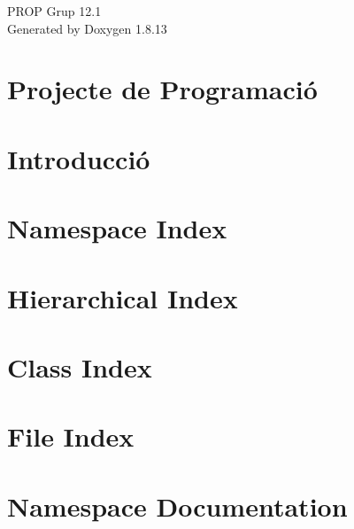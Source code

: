 \documentclass[twoside]{book}
\newcommand{\+}{\discretionary{\mbox{\scriptsize$\hookleftarrow$}}{}{}}
\newcommand{\clearemptydoublepage}{%
  \newpage{\pagestyle{empty}\cleardoublepage}%
}
\begin{document}
\hypersetup{pageanchor=false,
             bookmarksnumbered=true,
             pdfencoding=unicode
            }
\begin{titlepage}
\vspace*{7cm}
\begin{center}%
{\Large P\+R\+OP Grup 12.1 }\\
\vspace*{1cm}
{\large Generated by Doxygen 1.8.13}\\
\end{center}
\end{titlepage}
\clearemptydoublepage
{}
\tableofcontents
\clearemptydoublepage
{}
\hypersetup{pageanchor=true}

\chapter{Projecte de Programació}
\label{index}\hypertarget{index}{}
\chapter{Introducció}
\label{md_docs_HARDCODE_Jocs_de_proves}

\chapter{Namespace Index}

\chapter{Hierarchical Index}

\chapter{Class Index}

\chapter{File Index}

\chapter{Namespace Documentation}









\end{document}
